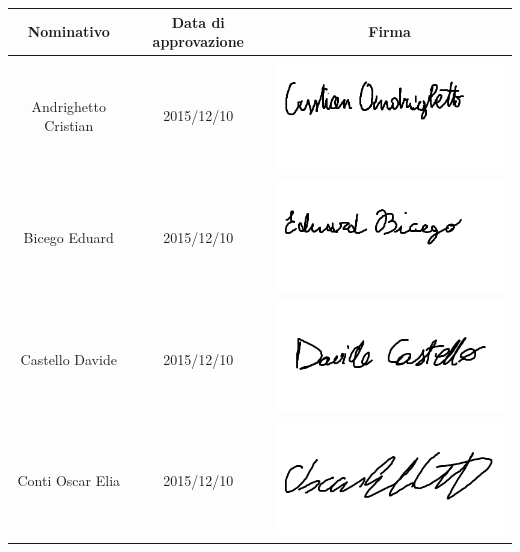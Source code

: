 \documentclass[PianoProgetto.tex]{subfiles}
\begin{document}
\begin{appendices}
\begin{table}[h]
		\begin{tabularx}{\textwidth}{C C C}
			\toprule
			\textbf{Nominativo} & \textbf{Data di approvazione} & \textbf{Firma} \\
			\midrule
			Andrighetto Cristian & 2015/12/10 &	\includegraphics[scale=0.3, trim=0 2.3cm 0 0.3cm]{firme_componenti/candrig_firma} \\[1.2ex]
			Bicego Eduard & 2015/12/10 & \includegraphics[scale=0.4, trim=0 3cm 0 0.1cm]{firme_componenti/edubic_firma} \\[1.2ex]
			Castello Davide	& 2015/12/10 & \includegraphics[scale=0.3, trim=0 2.3cm 0 0.3cm]{firme_componenti/dcastello_firma} \\[1.2ex]
			Conti Oscar Elia & 2015/12/10 &	 \includegraphics[scale=0.3, trim=0 2.3cm 0 0.3cm]{firme_componenti/oconti_firma} \\[1.2ex]

\end{tabularx}
\end{table}
\end{appendices}
\end{document}
